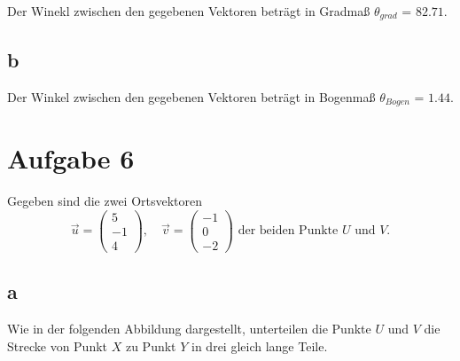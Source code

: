 Der Winekl zwischen den gegebenen Vektoren beträgt in Gradmaß $\theta_{grad}$ = $82.71$.

\subsection{b}

Der Winkel zwischen den gegebenen Vektoren beträgt in Bogenmaß $\theta_{Bogen}$ = $1.44$.

\section{Aufgabe 6}

Gegeben sind die zwei Ortsvektoren
\[
    \vec{u} = \begin{pmatrix}
        5 \\ -1 \\ 4
    \end{pmatrix}, \quad \vec{v} = \begin{pmatrix}
        -1 \\ 0 \\ -2
    \end{pmatrix} \text{ der beiden Punkte } U \text{ und } V\text{.}
\]

\subsection{a}

Wie in der folgenden Abbildung dargestellt, unterteilen die Punkte $U$ und $V$ die Strecke von Punkt $X$ zu Punkt $Y$ in drei gleich lange Teile.

\begin{center}
\end{center}

